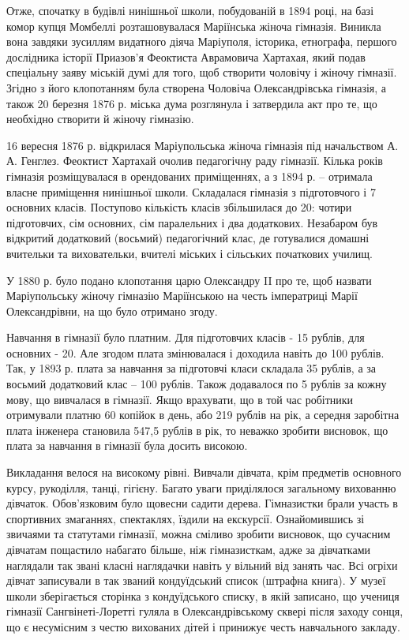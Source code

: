 
Отже, спочатку в будівлі нинішньої школи, побудованій в 1894 році, на базі
комор купця Момбеллі розташовувалася Маріїнська жіноча гімназія. Виникла вона
завдяки зусиллям видатного діяча Маріуполя, історика, етнографа, першого
дослідника історії Приазов'я Феоктиста Аврамовича Хартахая, який подав
спеціальну заяву міській думі для того, щоб створити чоловічу і жіночу
гімназії. Згідно з його клопотанням була створена Чоловіча Олександрівська
гімназія, а також 20 березня 1876 р. міська дума розглянула і затвердила акт
про те, що необхідно створити й жіночу гімназію.

16 вересня 1876 р. відкрилася Маріупольська жіноча гімназія під начальством
А. А. Генглез. Феоктист  Хартахай очолив педагогічну раду гімназії. Кілька років
гімназія розміщувалася в орендованих приміщеннях, а з 1894 р. – отримала власне
приміщення нинішньої школи. Складалася гімназія з підготовчого і 7 основних
класів. Поступово кількість класів збільшилася до 20: чотири підготовчих, сім
основних, сім паралельних і два додаткових. Незабаром був відкритий додатковий
(восьмий) педагогічний клас, де готувалися домашні вчительки та виховательки,
вчителі міських і сільських початкових училищ.

У 1880 р. було подано клопотання царю Олександру II про те, щоб назвати
Маріупольську жіночу гімназію Маріїнською на честь імператриці Марії
Олександрівни, на що було отримано згоду.

Навчання в гімназії було платним. Для підготовчих класів - 15 рублів, для
основних - 20. Але згодом плата змінювалася і доходила навіть до 100 рублів.
Так, у 1893 р. плата за навчання за підготовчі класи складала 35 рублів, а за
восьмий додатковий клас – 100 рублів. Також додавалося по 5 рублів за кожну
мову, що вивчалася в гімназії. Якщо врахувати, що в той час робітники
отримували платню 60 копійок в день, або 219 рублів на рік, а середня заробітна
плата інженера становила 547,5 рублів в рік, то неважко зробити висновок, що
плата за навчання в гімназії була досить високою.


Викладання велося на високому рівні. Вивчали дівчата, крім предметів основного
курсу, рукоділля, танці, гігієну. Багато уваги приділялося загальному вихованню
дівчаток. Обов'язковим було щовесни садити дерева. Гімназистки брали участь в
спортивних змаганнях, спектаклях, їздили на екскурсії. Ознайомившись зі
звичаями та статутами гімназії, можна сміливо зробити висновок, що сучасним
дівчатам пощастило набагато більше, ніж гімназисткам, адже за дівчатками
наглядали так звані класні наглядачки навіть у вільний від занять час. Всі
огріхи дівчат записували в так званий кондуїдський список (штрафна книга). У
музеї школи зберігається сторінка з кондуїдського списку, в якій записано, що
учениця гімназії Сангвінеті-Лоретті гуляла в Олександрівському сквері після
заходу сонця, що є несумісним з честю вихованих дітей і принижує честь
навчального закладу.

